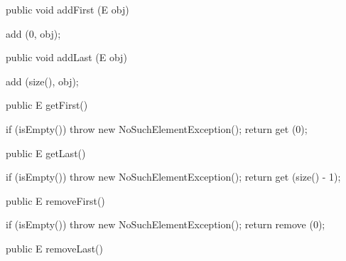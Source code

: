 \begin{code}

   public void addFirst (E obj)\begin{hide} {
      add (0, obj);
   }\end{hide}
\end{code}
\begin{code}

   public void addLast (E obj)\begin{hide} {
      add (size(), obj);
   }\end{hide}
\end{code}
\begin{code}

   public E getFirst()\begin{hide} {
      if (isEmpty())
         throw new NoSuchElementException();
      return get (0);
    }\end{hide}
\end{code}
\begin{code}

   public E getLast()\begin{hide} {
      if (isEmpty())
         throw new NoSuchElementException();
      return get (size() - 1);
   }\end{hide}
\end{code}
\begin{code}

   public E removeFirst()\begin{hide} {
      if (isEmpty())
         throw new NoSuchElementException();
      return remove (0);
   }\end{hide}
\end{code}
\begin{code}

   public E removeLast() \begin{hide} {
      if (isEmpty())
         throw new NoSuchElementException();
      return remove (size() - 1);
   }
}\end{hide}
\end{code}
